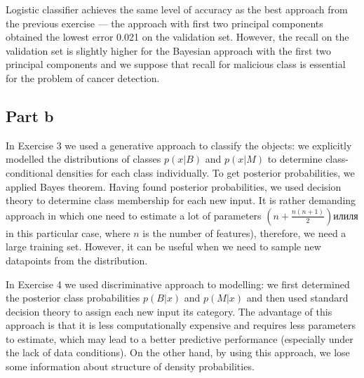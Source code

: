 \documentclass[11pt,a4paper]{article}
\begin{document}
Logistic classifier achieves the same level of accuracy as the best approach from the previous exercise --- the approach with first two principal components obtained the lowest error 0.021 on the validation set. However, the recall on the validation set is slightly higher for the Bayesian approach with the first two principal components and we suppose that recall for malicious class is essential for the problem of cancer detection.

\subsection*{Part b}
In Exercise 3 we used a generative approach to classify the objects: we explicitly modelled the distributions of classes $p(x| B)$ and $p(x | M)$ to determine class-conditional densities for each class individually. To get posterior probabilities, we applied Bayes theorem. Having found posterior probabilities, we used decision theory to determine class membership for each new input. It is rather demanding approach in which one need to estimate a lot of parameters $\left(n + \frac{n(n + 1)}{2}\right)$илиля  in this particular case, where $n$ is the number of features), therefore, we need a large training set. However, it can be useful when we need to sample new datapoints from the distribution.

In Exercise 4 we used discriminative approach to modelling: we first determined the posterior class probabilities $p(B | x)$ and $p(M | x)$ and then used standard decision theory to assign each new input its category. The advantage of this approach is that it is less computationally expensive and requires less parameters to estimate, which may lead to a better predictive performance (especially under the lack of data conditions). On the other hand, by using this approach, we lose some information about structure of density probabilities.

 
\end{document}
